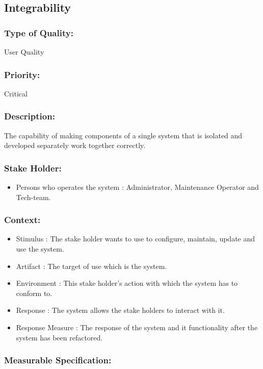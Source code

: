 \documentclass[11pt]{article}
\begin{document}
	\subsection{Integrability}
		
		\subsubsection{Type of Quality:}
			\textbf{} User Quality
		
		\subsubsection{Priority:}
		\textbf{} Critical
		
		\subsubsection{Description:}
			\textbf{}The capability of making components of a single system that is isolated and developed separately work together correctly.
		
		\subsubsection{Stake Holder:}
			\begin{itemize}
				\item Persons who operates the system : Administrator, Maintenance Operator and Tech-team.
			\end{itemize}
		\subsubsection{Context:}
			\begin{itemize}
				\item Stimulus : The stake holder wants to use to configure, maintain, update and use the system.
				\item Artifact : The target of use which is the system.
				\item Environment : This stake holder’s action with which the system has to conform to.
				\item Response : The system allows the stake holders to interact with it.
				\item Response Measure : The response of the system and it functionality after the system has 				  been refactored.
			\end{itemize}
				
		\subsubsection{Measurable Specification:}
			
\end{document}
